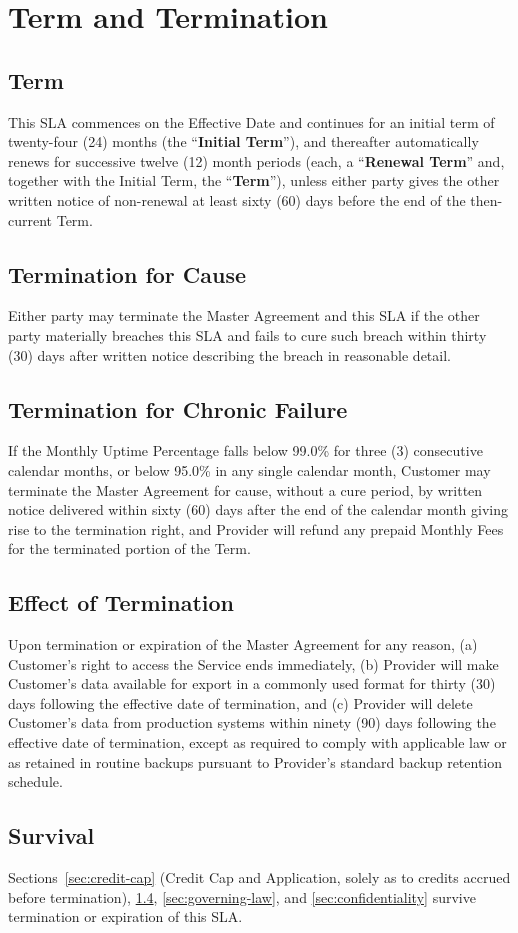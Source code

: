 \section{Term and Termination}
\label{sec:term}

\subsection{Term}
This SLA commences on the Effective Date and continues for an initial term of twenty-four (24) months (the ``\textbf{Initial Term}''), and thereafter automatically renews for successive twelve (12) month periods (each, a ``\textbf{Renewal Term}'' and, together with the Initial Term, the ``\textbf{Term}''), unless either party gives the other written notice of non-renewal at least sixty (60) days before the end of the then-current Term.

\subsection{Termination for Cause}
Either party may terminate the Master Agreement and this SLA if the other party materially breaches this SLA and fails to cure such breach within thirty (30) days after written notice describing the breach in reasonable detail.

\subsection{Termination for Chronic Failure}
\label{sec:chronic-failure}
If the Monthly Uptime Percentage falls below 99.0\% for three (3) consecutive calendar months, or below 95.0\% in any single calendar month, Customer may terminate the Master Agreement for cause, without a cure period, by written notice delivered within sixty (60) days after the end of the calendar month giving rise to the termination right, and Provider will refund any prepaid Monthly Fees for the terminated portion of the Term.

\subsection{Effect of Termination}
\label{sec:effect-termination}
Upon termination or expiration of the Master Agreement for any reason, (a) Customer's right to access the Service ends immediately, (b) Provider will make Customer's data available for export in a commonly used format for thirty (30) days following the effective date of termination, and (c) Provider will delete Customer's data from production systems within ninety (90) days following the effective date of termination, except as required to comply with applicable law or as retained in routine backups pursuant to Provider's standard backup retention schedule.

\subsection{Survival}
Sections~\ref{sec:credit-cap} (Credit Cap and Application, solely as to credits accrued before termination), \ref{sec:effect-termination}, \ref{sec:governing-law}, and \ref{sec:confidentiality} survive termination or expiration of this SLA.
